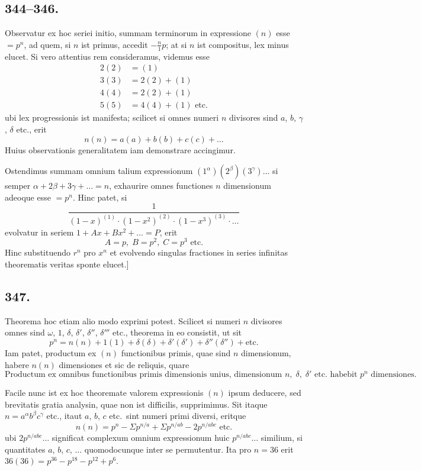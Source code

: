 \documentclass[12pt,a4paper]{article}
\begin{document}
\subsection*{344--346.}

Observatur ex hoc seriei initio, summam terminorum in expressione $(n)$ esse $=p^n$, ad quem, si $n$ ist primus, accedit $-\frac{n}{1}p$; at si $n$ ist compositus, lex minus elucet. Si vero attentius rem consideramus, videmus esse
\[
\begin{aligned}
2(2) &= (1)\\
3(3) &= 2(2) + (1)\\
4(4) &= 2(2) + (1)\\
5(5) &= 4(4) + (1) \text{ etc.}
\end{aligned}
\]
ubi lex progressionis ist manifesta; scilicet si omnes numeri $n$ divisores sind $a$, $b$, $\gamma$, $\delta$ etc., erit
\[
n(n) = a(a) + b(b) + c(c) + \ldots
\]
Huius observationis generalitatem iam demonstrare accingimur.

Ostendimus summam omnium talium expressionum $(1^\alpha)(2^\beta)(3^\gamma)\ldots$ si semper $\alpha+2\beta+3\gamma+\ldots=n$, exhaurire omnes functiones $n$ dimensionum adeoque esse $=p^n$. Hinc patet, si
\[
\frac{1}{(1-x)^{(1)}\cdot (1-x^2)^{(2)}\cdot (1-x^3)^{(3)}\cdot \ldots}
\]
evolvatur in seriem $1+Ax+Bx^2+\ldots=P$, erit
\[
A=p,\; B=p^2,\; C=p^3 \text{ etc.}
\]
Hinc substituendo $r^n$ pro $x^n$ et evolvendo singulas fractiones in series infinitas theorematis veritas sponte elucet.]

\subsection*{347.}

Theorema hoc etiam alio modo exprimi potest. Scilicet si numeri $n$ divisores omnes sind $\omega$, $1$, $\delta$, $\delta'$, $\delta''$, $\delta'''$ etc., theorema in eo consistit, ut sit
\[
p^n = n(n) + 1(1) + \delta(\delta) + \delta'(\delta') + \delta''(\delta'') + \text{etc.}
\]
Iam patet, productum ex $(n)$ functionibus primis, quae sind $n$ dimensionum, habere $n(n)$ dimensiones et sic de reliquis, quare
\[
\text{Productum ex omnibus functionibus primis dimensionis unius, dimensionum } n,\; \delta,\; \delta' \text{ etc.~habebit } p^n \text{ dimensiones.}
\]

Facile nunc ist ex hoc theoremate valorem expressionis $(n)$ ipsum deducere, sed brevitatis gratia analysin, quae non ist difficilis, supprimimus. Sit itaque $n=a^\alpha b^\beta c^\gamma$ etc., itaut $a$, $b$, $c$ etc.~sint numeri primi diversi, eritque
\[
n(n) = p^n - \Sigma p^{n/a} + \Sigma p^{n/ab} - 2p^{n/abc} \text{ etc.}
\]
ubi $2p^{n/abc}\ldots$ significat complexum omnium expressionum huic $p^{n/abc}\ldots$ similium, si quantitates $a$, $b$, $c$, $\ldots$ quomodocunque inter se permutentur. Ita pro $n=36$ erit $36(36) = p^{36} - p^{18} - p^{12} + p^6$.
\end{document}
